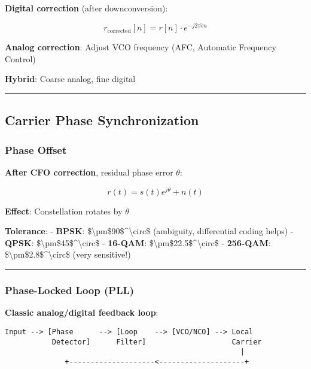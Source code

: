 \textbf{Digital correction} (after downconversion):

\[
r_{\text{corrected}}[n] = r[n] \cdot e^{-j 2\pi \hat{\epsilon} n}
\]

\textbf{Analog correction}: Adjust VCO frequency (AFC, Automatic
Frequency Control)

\textbf{Hybrid}: Coarse analog, fine digital

\begin{center}\rule{0.5\linewidth}{0.5pt}\end{center}

\subsection{Carrier Phase
Synchronization}\label{carrier-phase-synchronization}

\subsubsection{Phase Offset}\label{phase-offset}

\textbf{After CFO correction}, residual phase error \(\theta\):

\[
r(t) = s(t) e^{j\theta} + n(t)
\]

\textbf{Effect}: Constellation rotates by \(\theta\)

\textbf{Tolerance}: - \textbf{BPSK}:
\$\textbackslash pm\$90\$\^{}\textbackslash circ\$ (ambiguity,
differential coding helps) - \textbf{QPSK}:
\$\textbackslash pm\$45\$\^{}\textbackslash circ\$ - \textbf{16-QAM}:
\$\textbackslash pm\$22.5\$\^{}\textbackslash circ\$ - \textbf{256-QAM}:
\$\textbackslash pm\$2.8\$\^{}\textbackslash circ\$ (very sensitive!)

\begin{center}\rule{0.5\linewidth}{0.5pt}\end{center}

\subsubsection{Phase-Locked Loop (PLL)}\label{phase-locked-loop-pll}

\textbf{Classic analog/digital feedback loop}:

\begin{verbatim}
Input --> [Phase      --> [Loop    --> [VCO/NCO] --> Local
           Detector]      Filter]                    Carrier
                                                       |
              +--------------------<--------------------+
\end{verbatim}

